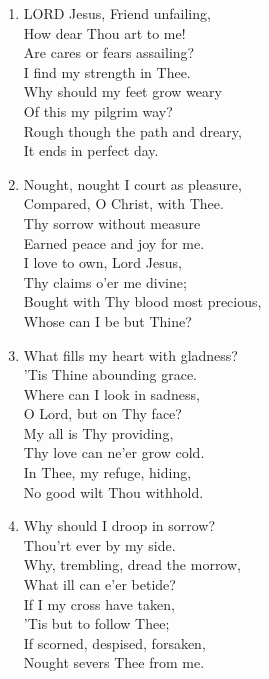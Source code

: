 \documentclass[11pt,a4paper]{article}
\begin{document}
\begin{enumerate}
    \item LORD Jesus, Friend unfailing, \\
            How dear Thou art to me! \\
        Are cares or fears assailing? \\
            I find my strength in Thee. \\
        Why should my feet grow weary \\
            Of this my pilgrim way? \\
        Rough though the path and dreary, \\
            It ends in perfect day.

    \item Nought, nought I court as pleasure, \\
            Compared, O Christ, with Thee. \\
        Thy sorrow without measure \\
            Earned peace and joy for me. \\
        I love to own, Lord Jesus, \\
            Thy claims o'er me divine; \\
        Bought with Thy blood most precious, \\
            Whose can I be but Thine?

    \item What fills my heart with gladness? \\
            'Tis Thine abounding grace. \\
        Where can I look in sadness, \\
            O Lord, but on Thy face? \\
        My all is Thy providing, \\
            Thy love can ne'er grow cold. \\
        In Thee, my refuge, hiding, \\
            No good wilt Thou withhold.

    \item Why should I droop in sorrow? \\
            Thou'rt ever by my side. \\
        Why, trembling, dread the morrow, \\
            What ill can e'er betide? \\
        If I my cross have taken, \\
            'Tis but to follow Thee; \\
        If scorned, despised, forsaken, \\
            Nought severs Thee from me.


\end{enumerate}
\end{document}
